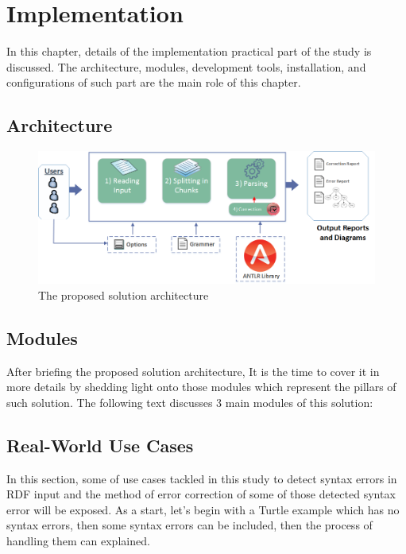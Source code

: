 \chapter{Implementation}
\label{ch:implementation}


In this chapter, details of the implementation practical part of the study is discussed. The architecture, modules, development tools, installation, and configurations of such part are the main role of this chapter.    
\section {Architecture}

	\begin{figure}[ht]
	\begin{center}
		\includegraphics[scale=0.5,angle=0]{images/Architecture}
		\caption{The proposed solution architecture}
		\label{Fig:Architecture}
	\end{center}
\end{figure}
\section {Modules} 
After briefing the proposed solution architecture, It is the time to cover it in more details by shedding light onto those modules which represent the pillars of such solution. The following text discusses 3 main modules of this solution:  
\section{Real-World Use Cases}
In this section, some of use cases tackled in this study to detect syntax errors in RDF input and  the method of error correction of some of those detected syntax error will be exposed. As a start, let's begin with a Turtle example which has no syntax errors, then some syntax errors can be included, then the process of handling them can explained. 
	\vspace{5mm} %

